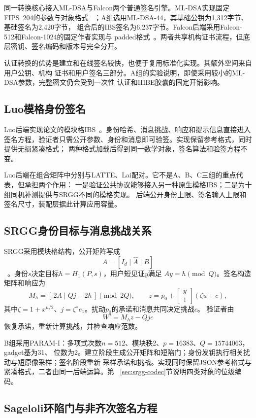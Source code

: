 同一转换核心接入ML-DSA与Falcon两个普通签名引擎。ML-DSA实现固定FIPS~204的参数与对象格式
~\cite{nist2024fips204}；A组选用ML-DSA-44，其基础公钥为1,312字节、基础签名为2,420字节，
组合后的IBS签名为6,237字节。Falcon后端采用Falcon-512和Falcon-1024的固定作者实现与
padded格式~\cite{falcon2020}。两者共享机构证书流程，但底层密钥、签名编码和版本号完全分开。

认证转换的优势是建立和在线签名较快，也便于复用标准化实现。其额外空间来自用户公钥、机构
证书和用户签名三部分。A组的实验说明，即使采用较小的ML-DSA参数，完整密文仍会受到一次性
认证和HIBE胶囊的固定开销影响。

\subsection{Luo模格身份签名}

Luo后端实现论文的模块格IBS~\cite{luo2024ibs}。身份哈希、消息挑战、响应和提示信息直接进入
签名方程，验证者只需公开参数、身份和消息即可验签。实现保留参考格式，同时提供无损紧凑格式；
两种格式加载后得到同一数学对象，签名算法和验签方程不变。

Luo后端在组合矩阵中分别与LATTE、Lai配对。它不是A、B、C三组的重点代表，但承担两个作用：
一是验证公共协议能够接入另一种原生模格IBS；二是为十组同机补测提供与SRGG不同的模格实现。
后端公开身份上限、签名输入上限和签名尺寸，装配层据此计算应用容量。

\subsection{SRGG身份目标与消息挑战关系}

SRGG采用模块格结构，公开矩阵写成
\[
 A=[I_d\mid\widehat A\mid B]
\]
~\cite{jia2025ibs}。身份$s$决定目标$h=H_1(P,s)$，用户短见证$y$满足
$Ay=h\pmod Q$。签名构造矩阵和响应为
\[
 M_h=[\,2A\mid Qj-2h\,]\pmod{2Q},
 \qquad
 z=p_0+\begin{bmatrix}y\\1\end{bmatrix}(\zeta u+c),
\]
其中$\zeta=1+x^{n/2}$、$j=\zeta^\star e_1$。扰动$p_0$的承诺和消息共同决定挑战$c$。
验证者由
\[
 W'=M_hz-Qjc
\]
恢复承诺，重新计算挑战，并检查响应范数。

B组采用PARAM-I：多项式次数$n=512$、模块秩2、$p=16383$、$Q=15744063$，gadget基为31、
位数为2。建立阶段生成公开矩阵和短陷门；身份发钥执行相关扰动与短原像采样；签名阶段重新
采样承诺和挑战。实现同时保留JSON参考格式与紧凑格式，二者由同一后端运算。第
~\ref{sec:srgg-codec}节说明四类对象的位级编码。

\subsection{Sageloli环陷门与非齐次签名方程}

